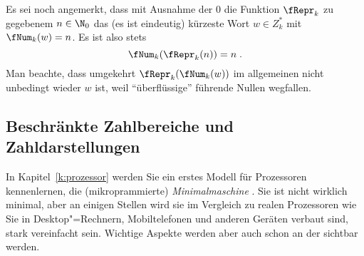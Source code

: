 %

Es sei noch angemerkt, dass mit Ausnahme der $0$
die Funktion $\fRepr_k$
zu gegebenem $n\in\N_0$
das (es ist eindeutig) kürzeste Wort $w\in Z_k^*$ mit $\fNum_k(w)=n$.
%
Es ist also stets
\[
\fNum_k(\fRepr_k(n)) = n \;.
\]
Man beachte, dass umgekehrt $\fRepr_k(\fNum_k(w))$ im allgemeinen
nicht unbedingt wieder $w$ ist, weil "`überflüssige"' führende Nullen
wegfallen.

\Tut\subsection{Beschr\"ankte Zahlbereiche und Zahldarstellungen}

In Kapitel~\ref{k:prozessor} werden Sie ein erstes Modell für
Prozessoren kennenlernen, die (mikroprammierte) \emph{Minimalmaschine}
\mima. 
%
Sie ist nicht wirklich minimal, aber an einigen Stellen wird sie im
Vergleich zu realen Prozessoren wie Sie in Desktop"=Rechnern,
Mobiltelefonen und anderen Geräten verbaut sind, stark vereinfacht
sein. 
%
Wichtige Aspekte werden aber auch schon an der \mima sichtbar werden.

